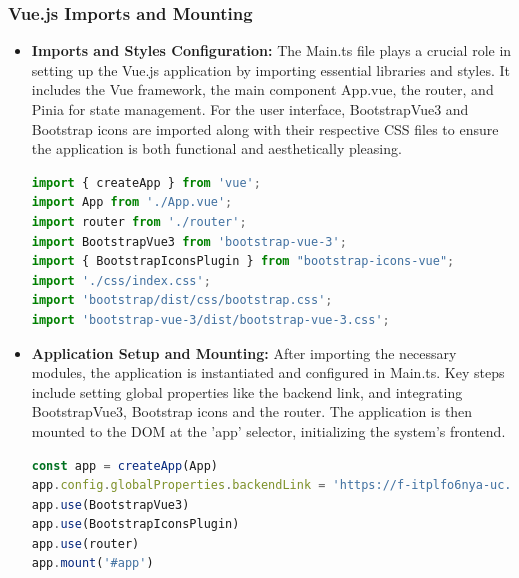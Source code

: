 \subsubsection{Vue.js Imports and Mounting}
\begin{itemize}
    \item \textbf{Imports and Styles Configuration:} The Main.ts file plays a crucial role in setting up the Vue.js application by importing essential libraries and styles. It includes the Vue framework, the main component App.vue, the router, and Pinia for state management. For the user interface, BootstrapVue3 and Bootstrap icons are imported along with their respective CSS files to ensure the application is both functional and aesthetically pleasing.
    \begin{lstlisting}[language=TypeScript]
import { createApp } from 'vue';
import App from './App.vue';
import router from './router';
import BootstrapVue3 from 'bootstrap-vue-3';
import { BootstrapIconsPlugin } from "bootstrap-icons-vue";
import './css/index.css';
import 'bootstrap/dist/css/bootstrap.css';
import 'bootstrap-vue-3/dist/bootstrap-vue-3.css';
    \end{lstlisting}

    \item \textbf{Application Setup and Mounting:} After importing the necessary modules, the application is instantiated and configured in Main.ts. Key steps include setting global properties like the backend link, and integrating BootstrapVue3, Bootstrap icons and the router. The application is then mounted to the DOM at the 'app' selector, initializing the system's frontend.
    \begin{lstlisting}[language=TypeScript]
const app = createApp(App)
app.config.globalProperties.backendLink = 'https://f-itplfo6nya-uc.a.run.app'
app.use(BootstrapVue3)
app.use(BootstrapIconsPlugin)
app.use(router)
app.mount('#app')
    \end{lstlisting}
\end{itemize}
\newpage
